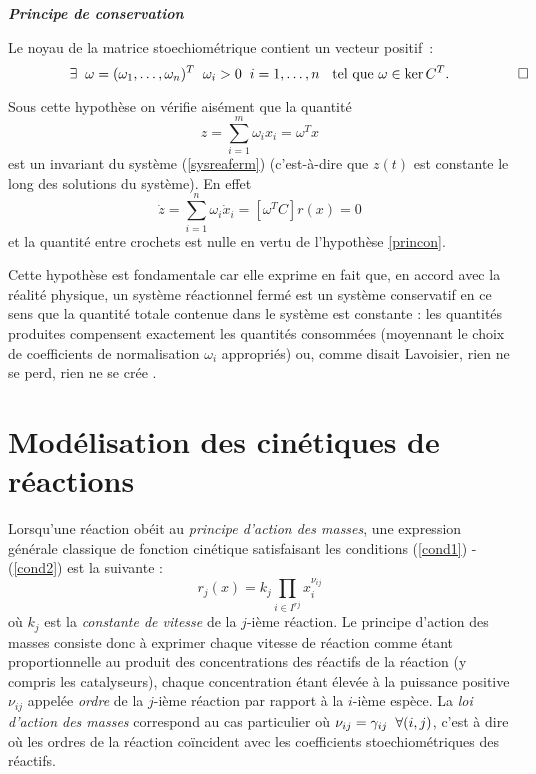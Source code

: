 \begin{hypothese} \label{princon} {\bf \em Principe de conservation}

Le noyau de la matrice stoechiométrique contient un vecteur positif~:
$$
\exists \hh \omega = (\omega_1, \ldots , \omega_n)^T \hh
\omega_i > 0 \hh i=1,\ldots,n \hh \mbox{ tel que } \omega \in \ker C^T. \xqedhere{2cm}{\qed}
$$
\end{hypothese}

Sous cette hypothèse on vérifie aisément que la quantité
$$
z = \sum_{i=1}^m \omega_i x_i = \omega^Tx
$$
est un invariant du système (\ref{sysreaferm}) (c'est-à-dire que $z(t)$
est constante le long des solutions du système). En effet
$$
\dot z = \sum_{i=1}^n \omega_i \dot x_i = [\omega^TC]r(x) = 0 
$$
et la quantité entre crochets est nulle en vertu de l'hypothèse \ref{princon}.

Cette hypothèse est fondamentale car elle exprime en fait que, en accord
avec la réalité physique, un système réactionnel fermé est un système
conservatif en ce sens que la quantité totale contenue dans le système est
constante : les quantités produites compensent exactement les quantités
consommées (moyennant le choix de coefficients de normalisation
$\omega_i$ appropriés) ou, comme disait Lavoisier, \og rien ne se perd, rien
ne se crée \fg.

\section{Modélisation des cinétiques de réactions}

Lorsqu'une réaction obéit au {\em principe d'action des masses}, une
expression  générale classique de fonction cinétique satisfaisant les
conditions (\ref{cond1}) - (\ref{cond2}) est la suivante : 
$$ 
r_j(x) = k_j\prod_{i \in I^{rj}} x_i^{\nu_{ij}} 
$$
où $k_j$ est la {\em constante de vitesse} de la $j$-ième réaction. Le principe d'action des masses consiste donc à exprimer chaque vitesse de réaction comme étant proportionnelle
au produit des concentrations des réactifs de la réaction (y compris les
catalyseurs), chaque concentration étant élevée à la puissance positive
$\nu_{ij}$ appelée {\em ordre} de la $j$-ième réaction par rapport à la
$i$-ième espèce. La {\em loi d'action des  masses} correspond au cas
particulier où $\nu_{ij} = \gamma_{ij} \hspace{2mm} \forall (i,j)$, c'est à dire 
où les ordres de la réaction coïncident avec les coefficients stoechiométriques des 
réactifs.

